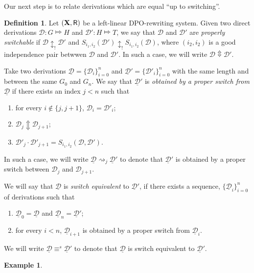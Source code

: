 \documentclass[a4paper]{article}
\def\R{\mathsf{R}}
\def\X{\textbf {\textup{X}}}
\newcommand{\dder}[1]{\mathscr{#1}}
\newcommand{\der}[1]{\underline{\dder{#1}}}
\theoremstyle{definition}
\newtheorem{definition}[theorem]{Definition}
\newtheorem{example}[theorem]{Example}
\begin{document}
Our next step is to relate derivations which are equal ``up to switching''.

\begin{definition}
  \label{de:switchable}
  Let $(\X, \R)$ be a left-linear DPO-rewriting system. Given two
  direct derivations $\dder{D}\colon G\Mapsto H$ and
  $\dder{D}'\colon H\Mapsto T$, we say that $\dder{D}$ and $\dder{D}'$
  are \emph{properly switchable} if $\dder{D}\updownarrow_! \dder{D'}$
  and $S_{i_1,i_2}(\dder{D}')\updownarrow_!S_{i_1,i_2}(\dder{D})$,
  where $(i_2,i_2)$ is a good independence pair betwwen $\dder{D}$ and
  $\dder{D}'$. In such a case, we will write
  $\dder{D}\Updownarrow\dder{D}'$.
	
Take two derivations $\der{D}=\{\dder{D}_{i}\}_{i=0}^n$ and $\der{D}'=\{\dder{D}'_{i}\}_{i=0}^n$ with the same length and between the same $G_0$ and $G_n$. We say that $\der{D}'$ is \emph{obtained by a proper switch from $\der{D}$} if there exists an index $j < n$ such that
	\begin{enumerate}
\item for every $i\notin \{j, j+1\} $, $\dder{D}_i=\dder{D}'_i$;
\item $\dder{D}_j \Updownarrow \dder{D}_{j+1}$;		
\item $\dder{D}'_j\cdot \dder{D}'_{j+1} = S_{i_1,i_2}(\dder{D}, \dder{D}')$.
	\end{enumerate}
	In such a case, we will write $\der{D}\rightsquigarrow_j \der{D}'$ to denote that $\der{D}'$ is obtained by a proper switch between $\dder{D}_j$ and $\dder{D}_{j+1}$. 
	
	We will say that $\der{D}$ is \emph{switch equivalent} to $\der{D}'$, if there exists a sequence, $\{\der{D}_i\}_{i=0}^n$ of derivations such that
	\begin{enumerate}
		\item $\der{D}_0=\der{D}$ and $\der{D}_n=\der{D}'$;
		\item for every $i< n$, $\der{D}_{i+1}$ is obtained by a proper switch from $\der{D}_i$.
	\end{enumerate}
	
	We will write $\der{D} \equiv^s \der{D}'$ to denote that $\der{D}$ is switch equivalent to $\der{D}'$.
\end{definition}


\begin{example}
\end{example}
\end{document}
